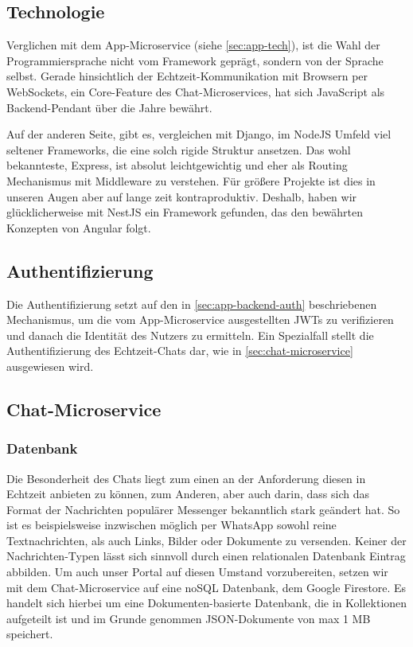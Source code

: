 \documentclass{article}
\begin{document}
\subsection{Technologie}

Verglichen mit dem App-Microservice (siehe \autoref{sec:app-tech}), ist die Wahl der Programmiersprache nicht vom Framework geprägt, sondern von der Sprache selbst. Gerade hinsichtlich der Echtzeit-Kommunikation mit Browsern per WebSockets, ein Core-Feature des Chat-Microservices, hat sich JavaScript als Backend-Pendant über die Jahre bewährt.

Auf der anderen Seite, gibt es, vergleichen mit Django, im NodeJS Umfeld viel seltener Frameworks, die eine solch rigide Struktur ansetzen. Das wohl bekannteste, Express, ist absolut leichtgewichtig und eher als Routing Mechanismus mit Middleware zu verstehen. Für größere Projekte ist dies in unseren Augen aber auf lange zeit kontraproduktiv. Deshalb, haben wir glücklicherweise mit NestJS ein Framework gefunden, das den bewährten Konzepten von Angular folgt.

\subsection{Authentifizierung}

Die Authentifizierung setzt auf den in \autoref{sec:app-backend-auth} beschriebenen Mechanismus, um die vom App-Microservice ausgestellten JWTs zu verifizieren und danach die Identität des Nutzers zu ermitteln. Ein Spezialfall stellt die Authentifizierung des Echtzeit-Chats dar, wie in \autoref{sec:chat-microservice} ausgewiesen wird.



\subsection{Chat-Microservice}
\label{sec:chat-microservice}



\subsubsection{Datenbank}

Die Besonderheit des Chats liegt zum einen an der Anforderung diesen in Echtzeit anbieten zu können, zum Anderen, aber auch darin, dass sich das Format der Nachrichten populärer Messenger bekanntlich stark geändert hat. So ist es beispielsweise inzwischen möglich per WhatsApp sowohl reine Textnachrichten, als auch Links, Bilder oder Dokumente zu versenden. Keiner der Nachrichten-Typen lässt sich sinnvoll durch einen relationalen Datenbank Eintrag abbilden. Um auch unser Portal auf diesen Umstand vorzubereiten, setzen wir mit dem Chat-Microservice auf eine noSQL Datenbank, dem Google Firestore. Es handelt sich hierbei um eine Dokumenten-basierte Datenbank, die in Kollektionen aufgeteilt ist und im Grunde genommen JSON-Dokumente von max 1 MB speichert.
\end{document}
